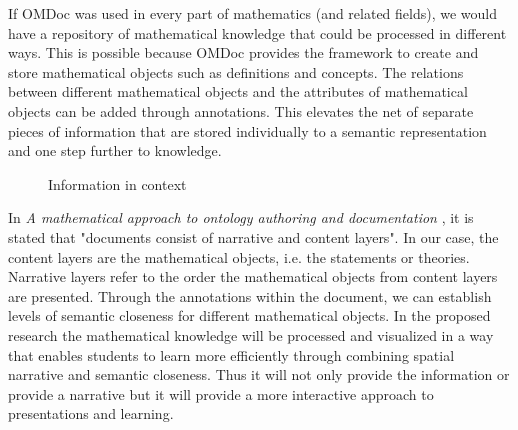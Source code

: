 \documentclass[twoside, 12pt]{article}
\begin{document}
If OMDoc was used in every part of mathematics (and related fields), we would have a repository of mathematical knowledge that could be processed in different ways. This is possible because OMDoc provides the framework to create and store mathematical objects such as definitions and concepts. The relations between different mathematical objects and the attributes of mathematical objects can be added through annotations. This elevates the net of separate pieces of information that are stored individually to a semantic representation and one step further to knowledge.\\

\begin{figure}
\vspace{-26pt}
  \begin{center}
  \end{center}
\vspace{-20pt}
  \caption{Information in context}
  \label{fig:Annie-context}
\vspace{-10pt}
\end{figure}

In \textit{A mathematical approach to ontology authoring and
documentation} \cite{LK:MathOntoAuthDoc09}, it is stated that "documents consist of narrative and content layers". In our case, the content layers are the mathematical objects, i.e. the statements or theories. Narrative layers refer to the order the mathematical objects from content layers are presented. Through the annotations within the document, we can establish levels of semantic closeness for different mathematical objects. In the proposed research the mathematical knowledge will be processed and visualized in a way that enables students to learn more efficiently through combining spatial narrative and semantic closeness. Thus it will not only provide the information or provide a narrative but it will provide a more interactive approach to presentations and learning.\\
\end{document}

